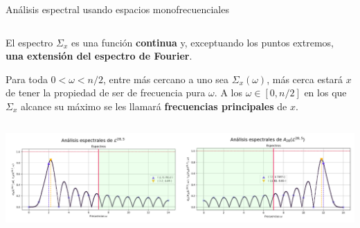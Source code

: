 \documentclass[final,hyperref={pdfpagelabels=false}]{beamer}
\newcommand{\IR}{\mathbb{R}}
\begin{document}
\begin{frame}
\begin{columns}
\begin{column}{.49\textwidth}
\begin{block}{An\'alisis espectral usando espacios monofrecuenciales}
\begin{columns}
\begin{column}{.39\textwidth}
				{\small{El espectro $\Sigma_{x}$ es una funci\'on
			\textbf{continua} y, exceptuando los puntos extremos, 
			\textbf{una extensi\'on
			del espectro de Fourier}.
				
					Para toda $0 < \omega < n/2$,
			entre m\'as cercano a uno sea $\Sigma_{x}(\omega)$,
			m\'as cerca estar\'a $x$ de tener la propiedad de ser
			de frecuencia pura $\omega$. A los $\omega \in [0, n/2]$
			en los que $\Sigma_{x}$ alcance su m\'aximo se les llamar\'a
			\textbf{frecuencias principales} de $x$.}}
                \end{column}
              \end{columns}
              
              \begin{center}
                   \includegraphics[width=0.7\linewidth]{alter_espec}
                  \end{center}
              
            \end{block}
            \vfill
            \vspace{1cm}
            
            

			
			
			
			

\end{column}
\end{columns}
\end{frame}
\end{document}
